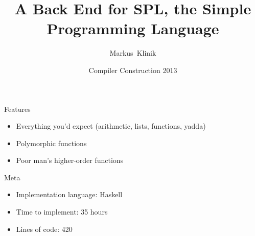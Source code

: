 \documentclass{beamer}
\title
{A Back End for SPL, the Simple Programming Language}
\author
{Markus~Klinik}
\institute[Radboud University Nijmegen]
{
  Radboud University Nijmegen
}
\date
{Compiler Construction 2013}
\begin{document}
\begin{frame}
  \titlepage
\end{frame}

\begin{frame}{Features}

  \begin{itemize}
    \item Everything you'd expect (arithmetic, lists, functions, yadda)
    \item Polymorphic functions
    \item Poor man's higher-order functions
  \end{itemize}

\end{frame}

\begin{frame}{Meta}

  \begin{itemize}
    \item Implementation language: Haskell
    \item Time to implement: 35 hours
    \item Lines of code: 420
  \end{itemize}

\end{frame}
\end{document}
